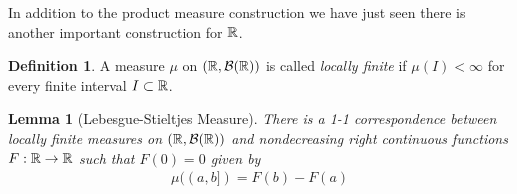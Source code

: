 \documentclass{amsart}
\newtheorem{lem}[thm]{Lemma}
\theoremstyle{remark}
\theoremstyle{definition}
\newtheorem{defn}[thm]{Definition}
\begin{document}
In addition to the product measure construction we have just seen
there is another important construction for $\mathbb{R}$.
\begin{defn}A measure $\mu$ on $(\mathbb{R}, \mathcal{B}(\mathbb{R}))$ is called
  \emph{locally finite} if $\mu(I) < \infty$ for every finite interval
  $I \subset \mathbb{R}$.
\end{defn}
\begin{lem}[Lebesgue-Stieltjes
  Measure]\label{LebesgueStieltjesMeasure}There is a 1-1
  correspondence between locally finite measures on $(\mathbb{R},\mathcal{B}(\mathbb{R}))$ and
  nondecreasing right continuous functions $F : \mathbb{R} \to \mathbb{R}$ such that $F(0)=0$ given by 
\begin{align*}
\mu((a,b]) = F(b) - F(a)
\end{align*}
\end{lem}
\end{document}
